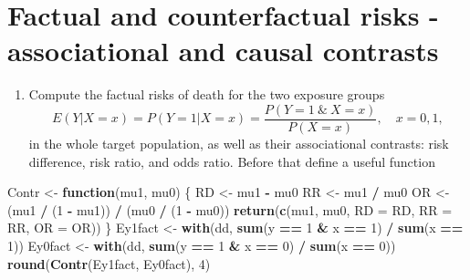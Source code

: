 \documentclass[
]{book}
\newenvironment{Shaded}{\begin{snugshade}}{\end{snugshade}}
\newcommand{\AttributeTok}[1]{\textcolor[rgb]{0.13,0.29,0.53}{#1}}
\newcommand{\ControlFlowTok}[1]{\textcolor[rgb]{0.13,0.29,0.53}{\textbf{#1}}}
\newcommand{\DecValTok}[1]{\textcolor[rgb]{0.00,0.00,0.81}{#1}}
\newcommand{\FunctionTok}[1]{\textcolor[rgb]{0.13,0.29,0.53}{\textbf{#1}}}
\newcommand{\NormalTok}[1]{#1}
\newcommand{\OtherTok}[1]{\textcolor[rgb]{0.56,0.35,0.01}{#1}}
\newcommand{\SpecialCharTok}[1]{\textcolor[rgb]{0.81,0.36,0.00}{\textbf{#1}}}
\providecommand{\tightlist}{%
  \setlength{\itemsep}{0pt}\setlength{\parskip}{0pt}}
\begin{document}
\section{Factual and counterfactual risks - associational and causal contrasts}\label{factual-and-counterfactual-risks---associational-and-causal-contrasts}

\begin{enumerate}
\def\labelenumi{\arabic{enumi}.}
\tightlist
\item
  Compute the factual risks of death for the two exposure groups
  \[ E(Y|X=x) = P(Y=1|X=x) = \frac{P(Y=1\ \&\ X=x)}{P(X=x)},
  \quad x=0,1, \]
  in the whole target population, as well as their
  associational contrasts: risk difference, risk ratio, and odds
  ratio. Before that define a useful function
\end{enumerate}

\begin{Shaded}
\begin{Highlighting}[]
\NormalTok{Contr }\OtherTok{\textless{}{-}} \ControlFlowTok{function}\NormalTok{(mu1, mu0) \{}
\NormalTok{  RD }\OtherTok{\textless{}{-}}\NormalTok{ mu1 }\SpecialCharTok{{-}}\NormalTok{ mu0}
\NormalTok{  RR }\OtherTok{\textless{}{-}}\NormalTok{ mu1 }\SpecialCharTok{/}\NormalTok{ mu0}
\NormalTok{  OR }\OtherTok{\textless{}{-}}\NormalTok{ (mu1 }\SpecialCharTok{/}\NormalTok{ (}\DecValTok{1} \SpecialCharTok{{-}}\NormalTok{ mu1)) }\SpecialCharTok{/}\NormalTok{ (mu0 }\SpecialCharTok{/}\NormalTok{ (}\DecValTok{1} \SpecialCharTok{{-}}\NormalTok{ mu0))}
  \FunctionTok{return}\NormalTok{(}\FunctionTok{c}\NormalTok{(mu1, mu0, }\AttributeTok{RD =}\NormalTok{ RD, }\AttributeTok{RR =}\NormalTok{ RR, }\AttributeTok{OR =}\NormalTok{ OR))}
\NormalTok{\}}
\NormalTok{Ey1fact }\OtherTok{\textless{}{-}} \FunctionTok{with}\NormalTok{(dd, }\FunctionTok{sum}\NormalTok{(y }\SpecialCharTok{==} \DecValTok{1} \SpecialCharTok{\&}\NormalTok{ x }\SpecialCharTok{==} \DecValTok{1}\NormalTok{) }\SpecialCharTok{/} \FunctionTok{sum}\NormalTok{(x }\SpecialCharTok{==} \DecValTok{1}\NormalTok{))}
\NormalTok{Ey0fact }\OtherTok{\textless{}{-}} \FunctionTok{with}\NormalTok{(dd, }\FunctionTok{sum}\NormalTok{(y }\SpecialCharTok{==} \DecValTok{1} \SpecialCharTok{\&}\NormalTok{ x }\SpecialCharTok{==} \DecValTok{0}\NormalTok{) }\SpecialCharTok{/} \FunctionTok{sum}\NormalTok{(x }\SpecialCharTok{==} \DecValTok{0}\NormalTok{))}
\FunctionTok{round}\NormalTok{(}\FunctionTok{Contr}\NormalTok{(Ey1fact, Ey0fact), }\DecValTok{4}\NormalTok{)}
\end{Highlighting}
\end{Shaded}
\end{document}
